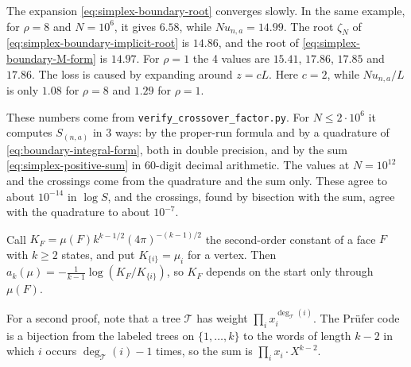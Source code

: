 \begin{remark}
The expansion \eqref{eq:simplex-boundary-root} converges slowly. In the
same example, for $\rho=8$ and $N=10^6$, it gives $6.58$, while
$Nu_{n,a}=14.99$. The root $\zeta_N$ of
\eqref{eq:simplex-boundary-implicit-root} is $14.86$, and the root of
\eqref{eq:simplex-boundary-M-form} is $14.97$. For $\rho=1$ the 4 values
are $15.41$, $17.86$, $17.85$ and $17.86$. The loss is caused by expanding
around $z=cL$. Here $c=2$, while $Nu_{n,a}/L$ is only $1.08$ for $\rho=8$
and $1.29$ for $\rho=1$.

These numbers come from \texttt{verify\_crossover\_factor.py}. For
$N\le2\cdot10^6$ it computes $S_{(n,a)}$ in 3 ways: by the proper-run formula
and by a quadrature of \eqref{eq:boundary-integral-form}, both in double
precision, and by the sum \eqref{eq:simplex-positive-sum} in 60-digit decimal
arithmetic. The values at $N=10^{12}$ and the crossings come from the
quadrature and the sum only. These agree to about $10^{-14}$ in $\log S$, and
the crossings, found by bisection with the sum, agree with the quadrature to
about $10^{-7}$.
\end{remark}

Call $K_F=\mu(F)k^{k-1/2}(4\pi)^{-(k-1)/2}$ the second-order constant of a face
$F$ with $k\ge2$ states, and put $K_{\{i\}}=\mu_i$ for a vertex. Then
$a_k(\mu)=-\frac1{k-1}\log(K_F/K_{\{i\}})$, so $K_F$ depends on the start only
through $\mu(F)$.

For a
second proof, note that a tree $\mathcal T$ has weight
$\prod_ix_i^{\deg_{\mathcal T}(i)}$. The Pr\"ufer code is a bijection from the
labeled trees on $\{1,\ldots,k\}$ to the words of length $k-2$ in which $i$
occurs $\deg_{\mathcal T}(i)-1$ times, so the sum is $\prod_ix_i\cdot X^{k-2}$.
